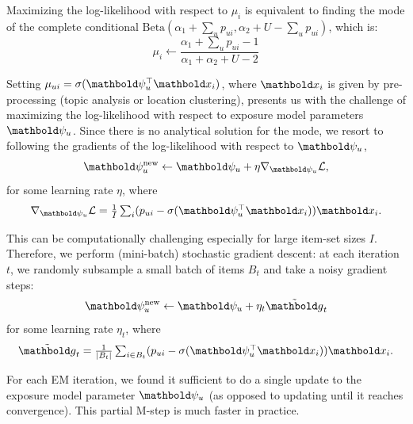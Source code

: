  Maximizing the log-likelihood with respect to $\mu_i$ is equivalent to finding the mode of the complete conditional $\mathrm{Beta}(\alpha_1 + \sum_u p_{ui}, \alpha_2 + U - \sum_u p_{ui})$, which is:
\begin{equation}\label{eq:mu_i}
\mu_i \leftarrow \frac{\alpha_1 + \sum_u p_{ui}- 1}{\alpha_1 + \alpha_2 + U - 2}
\end{equation}

 Setting $\mu_{ui} = \sigma(\mb\psi_u^\top \mbx_i)$, where $\mbx_i$ is given by pre-processing (topic analysis or location clustering), presents us with the challenge of maximizing the log-likelihood with respect to exposure model parameters $\mb\psi_u$. Since there is no analytical solution for the mode, we resort to following the gradients of the log-likelihood with respect to $\mb\psi_u$,
\begin{equation}
	\mb\psi_u^{\text{new}} \leftarrow \mb\psi_u + \eta \nabla_{\mb\psi_u} \mathcal{L}, %
	\label{eq:update_psi}
\end{equation}
for some learning rate $\eta$, where
\begin{equation*}
	\nabla_{\mb\psi_u} \mathcal{L} = \textstyle \frac{1}{I}\sum_i ( p_{ui} - \sigma(\mb\psi_u^\top \mbx_i))\mbx_i.
\end{equation*}

This can be computationally challenging especially for large item-set sizes $I$. Therefore, we perform (mini-batch) stochastic gradient descent: at each iteration $t$, we randomly subsample a small batch of items $B_t$ and take a noisy gradient steps:
\begin{equation} \label{eq:update_psi_sgd}
\mb\psi_u^{\text{new}} \leftarrow \mb\psi_u + \eta_t \tilde{\mb{g}}_t
\end{equation}
for some learning rate $\eta_t$, where
\begin{equation*}
\tilde{\mb{g}}_t = \textstyle \frac{1}{|B_t|}\sum_{i \in B_t} (p_{ui} - \sigma(\mb\psi_u^\top \mbx_i)) \mbx_i.
\end{equation*}

For each EM iteration, we found it sufficient to do a single update to the
exposure model parameter $\mb\psi_u$ (as opposed to updating until it
reaches convergence). This partial M-step \citep{neal1998view} is much faster in practice. 

